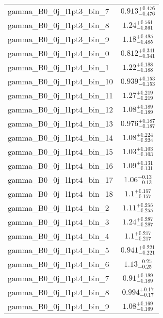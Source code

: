 \begin{tabular}{|l|c|}
gamma\_B0\_0j\_l1pt3\_bin\_7 & $0.913^{+0.476}_{-0.476}$ \\
gamma\_B0\_0j\_l1pt3\_bin\_8 & $1.24^{+0.561}_{-0.561}$ \\
gamma\_B0\_0j\_l1pt3\_bin\_9 & $1.18^{+0.485}_{-0.485}$ \\
gamma\_B0\_0j\_l1pt4\_bin\_0 & $0.812^{+0.341}_{-0.341}$ \\
gamma\_B0\_0j\_l1pt4\_bin\_1 & $1.22^{+0.188}_{-0.188}$ \\
gamma\_B0\_0j\_l1pt4\_bin\_10 & $0.939^{+0.153}_{-0.153}$ \\
gamma\_B0\_0j\_l1pt4\_bin\_11 & $1.27^{+0.219}_{-0.219}$ \\
gamma\_B0\_0j\_l1pt4\_bin\_12 & $1.08^{+0.189}_{-0.189}$ \\
gamma\_B0\_0j\_l1pt4\_bin\_13 & $0.976^{+0.187}_{-0.187}$ \\
gamma\_B0\_0j\_l1pt4\_bin\_14 & $1.08^{+0.224}_{-0.224}$ \\
gamma\_B0\_0j\_l1pt4\_bin\_15 & $1.03^{+0.103}_{-0.103}$ \\
gamma\_B0\_0j\_l1pt4\_bin\_16 & $1.09^{+0.131}_{-0.131}$ \\
gamma\_B0\_0j\_l1pt4\_bin\_17 & $1.06^{+0.13}_{-0.13}$ \\
gamma\_B0\_0j\_l1pt4\_bin\_18 & $1.1^{+0.157}_{-0.157}$ \\
gamma\_B0\_0j\_l1pt4\_bin\_2 & $1.11^{+0.255}_{-0.255}$ \\
gamma\_B0\_0j\_l1pt4\_bin\_3 & $1.24^{+0.287}_{-0.287}$ \\
gamma\_B0\_0j\_l1pt4\_bin\_4 & $1.1^{+0.217}_{-0.217}$ \\
gamma\_B0\_0j\_l1pt4\_bin\_5 & $0.941^{+0.221}_{-0.221}$ \\
gamma\_B0\_0j\_l1pt4\_bin\_6 & $1.13^{+0.25}_{-0.25}$ \\
gamma\_B0\_0j\_l1pt4\_bin\_7 & $0.91^{+0.189}_{-0.189}$ \\
gamma\_B0\_0j\_l1pt4\_bin\_8 & $0.994^{+0.17}_{-0.17}$ \\
gamma\_B0\_0j\_l1pt4\_bin\_9 & $1.08^{+0.169}_{-0.169}$ \\
\hline
\end{tabular}
